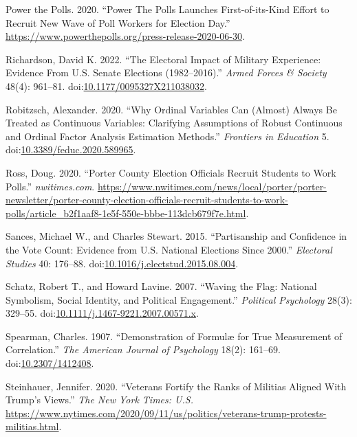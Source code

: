 \documentclass[
  12pt,
  letterpaper,
]{article}
\newlength{\cslhangindent}
\newenvironment{CSLReferences}[2] %
 {\begin{list}{}{%
  \setlength{\itemindent}{0pt}
  \setlength{\leftmargin}{0pt}
  \setlength{\parsep}{0pt}
  \ifodd #1
   \setlength{\leftmargin}{\cslhangindent}
   \setlength{\itemindent}{-1\cslhangindent}
  \fi
  \setlength{\itemsep}{#2\baselineskip}}}
 {\end{list}}
\begin{document}
\begin{CSLReferences}{1}{1}
Power the Polls. 2020. {``Power {The Polls Launches First-of-its-Kind
Effort} to {Recruit New Wave} of {Poll Workers} for {Election Day}.''}
\url{https://www.powerthepolls.org/press-release-2020-06-30}.

Richardson, David K. 2022. {``The {Electoral Impact} of {Military
Experience}: {Evidence From U}.{S}. {Senate Elections} (1982--2016).''}
\emph{Armed Forces \& Society} 48(4): 961--81.
doi:\href{https://doi.org/10.1177/0095327X211038032}{10.1177/0095327X211038032}.

Robitzsch, Alexander. 2020. {``Why {Ordinal Variables Can} ({Almost})
{Always Be Treated} as {Continuous Variables}: {Clarifying Assumptions}
of {Robust Continuous} and {Ordinal Factor Analysis Estimation
Methods}.''} \emph{Frontiers in Education} 5.
doi:\href{https://doi.org/10.3389/feduc.2020.589965}{10.3389/feduc.2020.589965}.

Ross, Doug. 2020. {``Porter {County} Election Officials Recruit Students
to Work Polls.''} \emph{nwitimes.com}.
\url{https://www.nwitimes.com/news/local/porter/porter-newsletter/porter-county-election-officials-recruit-students-to-work-polls/article_b2f1aaf8-1e5f-550e-bbbe-113dcb679f7e.html}.

Sances, Michael W., and Charles Stewart. 2015. {``Partisanship and
Confidence in the Vote Count: {Evidence} from {U}.{S}. National
Elections Since 2000.''} \emph{Electoral Studies} 40: 176--88.
doi:\href{https://doi.org/10.1016/j.electstud.2015.08.004}{10.1016/j.electstud.2015.08.004}.

Schatz, Robert T., and Howard Lavine. 2007. {``Waving the {Flag}:
{National Symbolism}, {Social Identity}, and {Political Engagement}.''}
\emph{Political Psychology} 28(3): 329--55.
doi:\href{https://doi.org/10.1111/j.1467-9221.2007.00571.x}{10.1111/j.1467-9221.2007.00571.x}.

Spearman, Charles. 1907. {``Demonstration of {Formulæ} for {True
Measurement} of {Correlation}.''} \emph{The American Journal of
Psychology} 18(2): 161--69.
doi:\href{https://doi.org/10.2307/1412408}{10.2307/1412408}.

Steinhauer, Jennifer. 2020. {``Veterans {Fortify} the {Ranks} of
{Militias Aligned With Trump}'s {Views}.''} \emph{The New York Times:
U.S.}
\url{https://www.nytimes.com/2020/09/11/us/politics/veterans-trump-protests-militias.html}.


\end{CSLReferences}
\end{document}
